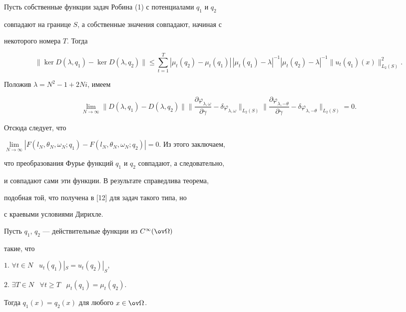  


Пусть собственные функции задач Робина (1) с потенциалами $q_1$ и $q_2$ 


совпадают на границе $S$, а собственные значения совпадают, начиная с 


некоторого номера $T$. Тогда 


$$ 


\|\ker D(\lambda,q_1)-\ker D(\lambda,q_2)\|\le\sum^T_{t=1} 


|\mu_t(q_2)-\mu_t(q_1)|\,|\mu_t(q_1)-\lambda|^{-1} 


|\mu_t(q_2)-\lambda|^{-1} 


\|u_t(q_1)(x)\|^2_{L_2(S)}. 


$$ 





Положив $\lambda=N^2-1+2N i$, имеем 


\begin{equation} 


\lim_{N\to\infty}\|D(\lambda,q_1)-D(\lambda,q_2)\|\bigg\| 


\frac{\partial\varphi_{\lambda,\omega}}{\partial\gamma}- 


\delta\varphi_{\lambda,\omega}\bigg\|_{L_2(S)}\bigg\| 


\frac{\partial\varphi_{\lambda,-\theta}}{\partial\gamma}- 


\delta\varphi_{\lambda,-\theta}\bigg\|_{L_2(S)}=0. 


\end{equation} 


Отсюда следует, что 


$\lim\limits_{N\to\infty}|F(l_N,\theta_N,\omega_N;q_1)- 


F(l_N,\theta_N,\omega_N;q_2)|=0$. Из этого заключаем, 


что преобразования Фурье функций $q_1$ и $q_2$ совпадают, а следовательно, 


и совпадают сами эти функции. В результате справедлива теорема, 


подобная той, что получена в [12] для задач такого типа, но 


с краевыми условиями Дирихле. 


 


\begin{thm} 


Пусть $q_1$, $q_2$ --- действительные функции из $C^\infty(\ov\Omega)$ 


такие, что 


 


$1.$ $\forall t\in N$ \ $u_t(q_1)|_S=u_t(q_2)|_S$, 


 


$2.$ $\exists T\in N$ \ $\forall t\ge T$ \ $\mu_t(q_1)=\mu_t(q_2)$. 


 


Тогда $q_1(x)=q_2(x)$ для любого $x\in\ov\Omega$. 


\end{thm} 


